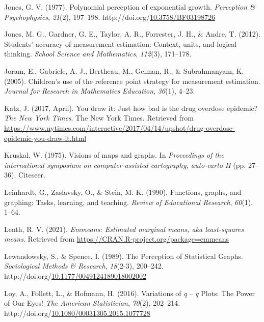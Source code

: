 \documentclass[print]{nuthesis}
\newlength{\cslhangindent}
\newenvironment{CSLReferences}[2]%
{\setlength{\parindent}{0pt}%
\everypar{\setlength{\hangindent}{\cslhangindent}}\ignorespaces}%
{\par}
\begin{document}
\begin{CSLReferences}{1}{0}
\leavevmode{}%
Jones, G. V. (1977). Polynomial perception of exponential growth. \emph{Perception \& Psychophysics}, \emph{21}(2), 197--198. http://doi.org/\href{https://doi.org/10.3758/BF03198726}{10.3758/BF03198726}

\leavevmode{}%
Jones, M. G., Gardner, G. E., Taylor, A. R., Forrester, J. H., \& Andre, T. (2012). Students' accuracy of measurement estimation: Context, units, and logical thinking. \emph{School Science and Mathematics}, \emph{112}(3), 171--178.

\leavevmode{}%
Joram, E., Gabriele, A. J., Bertheau, M., Gelman, R., \& Subrahmanyam, K. (2005). Children's use of the reference point strategy for measurement estimation. \emph{Journal for Research in Mathematics Education}, \emph{36}(1), 4--23.

\leavevmode{}%
Katz, J. (2017, April). You draw it: Just how bad is the drug overdose epidemic? \emph{The New York Times}. The New York Times. Retrieved from \url{https://www.nytimes.com/interactive/2017/04/14/upshot/drug-overdose-epidemic-you-draw-it.html}

\leavevmode{}%
Kruskal, W. (1975). Visions of maps and graphs. In \emph{Proceedings of the international symposium on computer-assisted cartography, auto-carto II} (pp. 27--36). Citeseer.

\leavevmode{}%
Leinhardt, G., Zaslavsky, O., \& Stein, M. K. (1990). Functions, graphs, and graphing: Tasks, learning, and teaching. \emph{Review of Educational Research}, \emph{60}(1), 1--64.

\leavevmode{}%
Lenth, R. V. (2021). \emph{Emmeans: Estimated marginal means, aka least-squares means}. Retrieved from \url{https://CRAN.R-project.org/package=emmeans}

\leavevmode{}%
Lewandowsky, S., \& Spence, I. (1989). The {Perception} of {Statistical} {Graphs}. \emph{Sociological Methods \& Research}, \emph{18}(2-3), 200--242. http://doi.org/\href{https://doi.org/10.1177/0049124189018002002}{10.1177/0049124189018002002}

\leavevmode{}%
Loy, A., Follett, L., \& Hofmann, H. (2016). Variations of \emph{q} -- \emph{q} {Plots}: {The} {Power} of {Our} {Eyes}! \emph{The American Statistician}, \emph{70}(2), 202--214. http://doi.org/\href{https://doi.org/10.1080/00031305.2015.1077728}{10.1080/00031305.2015.1077728}


\end{CSLReferences}
\end{document}
